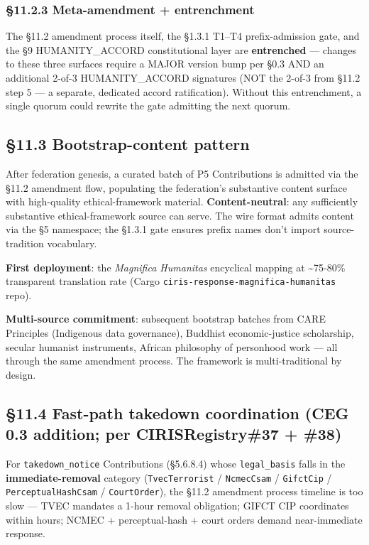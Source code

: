 \documentclass[11pt]{article}
\begin{document}
\subsubsection*{§11.2.3 Meta-amendment + entrenchment}


The §11.2 amendment process itself, the §1.3.1 T1–T4 prefix-admission gate, and the §9 HUMANITY\_ACCORD constitutional layer are \textbf{entrenched} — changes to these three surfaces require a MAJOR version bump per §0.3 AND an additional 2-of-3 HUMANITY\_ACCORD signatures (NOT the 2-of-3 from §11.2 step 5 — a separate, dedicated accord ratification). Without this entrenchment, a single quorum could rewrite the gate admitting the next quorum.


\subsection*{§11.3 Bootstrap-content pattern}


After federation genesis, a curated batch of P5 Contributions is admitted via the §11.2 amendment flow, populating the federation's substantive content surface with high-quality ethical-framework material. \textbf{Content-neutral}: any sufficiently substantive ethical-framework source can serve. The wire format admits content via the §5 namespace; the §1.3.1 gate ensures prefix names don't import source-tradition vocabulary.


\textbf{First deployment}: the \textit{Magnifica Humanitas} encyclical mapping at \textasciitilde{}75-80\% transparent translation rate (Cargo \texttt{ciris-response-magnifica-humanitas} repo).


\textbf{Multi-source commitment}: subsequent bootstrap batches from CARE Principles (Indigenous data governance), Buddhist economic-justice scholarship, secular humanist instruments, African philosophy of personhood work — all through the same amendment process. The framework is multi-traditional by design.


\subsection*{§11.4 Fast-path takedown coordination (CEG 0.3 addition; per CIRISRegistry\#37 + \#38)}


For \texttt{takedown\_notice} Contributions (§5.6.8.4) whose \texttt{legal\_basis} falls in the \textbf{immediate-removal} category (\texttt{TvecTerrorist} / \texttt{NcmecCsam} / \texttt{GifctCip} / \texttt{PerceptualHashCsam} / \texttt{CourtOrder}), the §11.2 amendment process timeline is too slow — TVEC mandates a 1-hour removal obligation; GIFCT CIP coordinates within hours; NCMEC + perceptual-hash + court orders demand near-immediate response.
\end{document}
